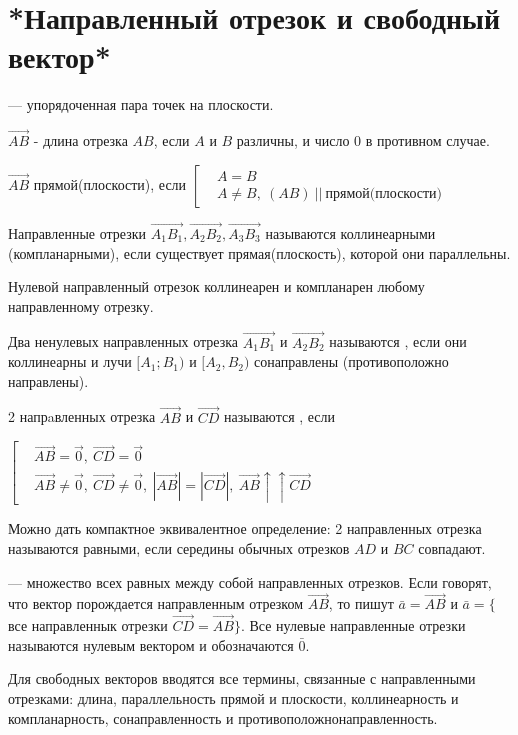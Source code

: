 \chapter{*Направленный отрезок и свободный вектор*}
\begin{opred}
 --- упорядоченная пара точек на плоскости.
\end{opred}
\begin{opred}
 $\vec{AB}$ - длина отрезка $AB$, если $A$ и $B$ различны, и число 0 в противном случае.
\end{opred}
\begin{opred}
$\vec{AB}$  прямой(плоскости), если $\left[\begin{aligned}
& A=B \\
& A\neq B,\ (AB)\ ||\ \mbox{прямой(плоскости)}
\end{aligned}\right.$
\end{opred}
\begin{opred}
Направленные отрезки $\vec{A_1B_1},\vec{A_2B_2},\vec{A_3B_3}$ называются коллинеарными (компланарными), если существует прямая(плоскость), которой они параллельны.
\end{opred}
\begin{remark}
Нулевой направленный отрезок коллинеарен и компланарен любому направленному отрезку.
\end{remark}
\begin{opred}
Два ненулевых направленных отрезка $\vec{A_1B_1}$ и $\vec{A_2B_2}$ называются , если они коллинеарны и лучи $[A_1;B_1)$ и $[A_2,B_2)$ сонаправлены (противоположно направлены).
\end{opred}
\begin{opred}
2 напрaвленных отрезка $\vec{AB}$ и $\vec{CD}$ называются , если

$\left[\begin{aligned}
&\vec{AB}=\vec{0},\ \vec{CD}=\vec{0}\\
&\vec{AB}\neq\vec{0},\ \vec{CD}\neq\vec{0},\ |\vec{AB}|=|\vec{CD}|,\ \vec{AB}\uparrow\uparrow\vec{CD}
\end{aligned}\right.$
\end{opred}
\begin{remark}
Можно дать компактное эквивалентное определение: 2 направленных отрезка называются равными, если середины обычных отрезков $AD$ и $BC$ совпадают.
\end{remark}
\begin{opred}
 --- множество всех равных между собой направленных отрезков. Если говорят, что вектор порождается направленным отрезком $\vec{AB}$, то пишут $\bar{a}=\vec{AB}$ и $\bar{a}=\{$все направленнык отрезки $\vec{CD}=\vec{AB}\}$. Все нулевые направленные отрезки называются нулевым вектором и обозначаются $\bar{0}$.

Для свободных векторов вводятся все термины, связанные с направленными отрезками: длина, параллельность прямой и плоскости, коллинеарность и компланарность, сонаправленность и противоположнонаправленность.
\end{opred}
